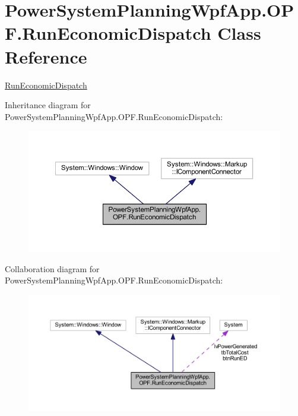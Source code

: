 \hypertarget{class_power_system_planning_wpf_app_1_1_o_p_f_1_1_run_economic_dispatch}{}\section{Power\+System\+Planning\+Wpf\+App.\+O\+P\+F.\+Run\+Economic\+Dispatch Class Reference}
\label{class_power_system_planning_wpf_app_1_1_o_p_f_1_1_run_economic_dispatch}


\hyperlink{class_power_system_planning_wpf_app_1_1_o_p_f_1_1_run_economic_dispatch}{Run\+Economic\+Dispatch}  




Inheritance diagram for Power\+System\+Planning\+Wpf\+App.\+O\+P\+F.\+Run\+Economic\+Dispatch\+:\nopagebreak
\begin{figure}[H]
\begin{center}
\leavevmode
\includegraphics[width=350pt]{class_power_system_planning_wpf_app_1_1_o_p_f_1_1_run_economic_dispatch__inherit__graph}
\end{center}
\end{figure}


Collaboration diagram for Power\+System\+Planning\+Wpf\+App.\+O\+P\+F.\+Run\+Economic\+Dispatch\+:\nopagebreak
\begin{figure}[H]
\begin{center}
\leavevmode
\includegraphics[width=350pt]{class_power_system_planning_wpf_app_1_1_o_p_f_1_1_run_economic_dispatch__coll__graph}
\end{center}
\end{figure}
